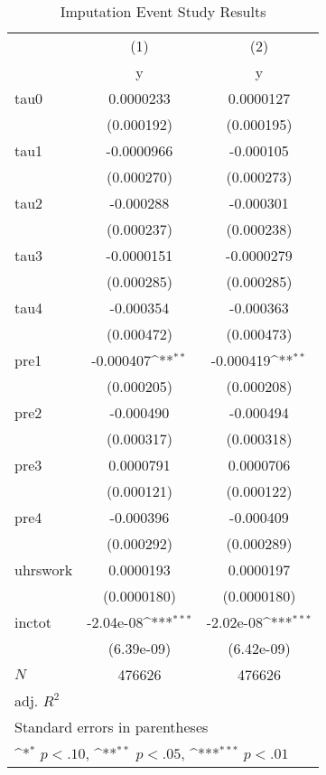 \begin{table}[htbp]\centering
\def\sym#1{\ifmmode^{#1}\else\(^{#1}\)\fi}
\caption{Imputation Event Study Results}
\begin{tabular}{l*{2}{c}}
\hline\hline
            &\multicolumn{1}{c}{(1)}&\multicolumn{1}{c}{(2)}\\
            &\multicolumn{1}{c}{y}&\multicolumn{1}{c}{y}\\
\hline
tau0        &   0.0000233         &   0.0000127         \\
            &  (0.000192)         &  (0.000195)         \\
[1em]
tau1        &  -0.0000966         &   -0.000105         \\
            &  (0.000270)         &  (0.000273)         \\
[1em]
tau2        &   -0.000288         &   -0.000301         \\
            &  (0.000237)         &  (0.000238)         \\
[1em]
tau3        &  -0.0000151         &  -0.0000279         \\
            &  (0.000285)         &  (0.000285)         \\
[1em]
tau4        &   -0.000354         &   -0.000363         \\
            &  (0.000472)         &  (0.000473)         \\
[1em]
pre1        &   -0.000407\sym{**} &   -0.000419\sym{**} \\
            &  (0.000205)         &  (0.000208)         \\
[1em]
pre2        &   -0.000490         &   -0.000494         \\
            &  (0.000317)         &  (0.000318)         \\
[1em]
pre3        &   0.0000791         &   0.0000706         \\
            &  (0.000121)         &  (0.000122)         \\
[1em]
pre4        &   -0.000396         &   -0.000409         \\
            &  (0.000292)         &  (0.000289)         \\
[1em]
uhrswork    &   0.0000193         &   0.0000197         \\
            & (0.0000180)         & (0.0000180)         \\
[1em]
inctot      &   -2.04e-08\sym{***}&   -2.02e-08\sym{***}\\
            &  (6.39e-09)         &  (6.42e-09)         \\
\hline
\(N\)       &      476626         &      476626         \\
adj. \(R^{2}\)&                     &                     \\
\hline\hline
\multicolumn{3}{l}{\footnotesize Standard errors in parentheses}\\
\multicolumn{3}{l}{\footnotesize \sym{*} \(p<.10\), \sym{**} \(p<.05\), \sym{***} \(p<.01\)}\\
\end{tabular}
\end{table}
